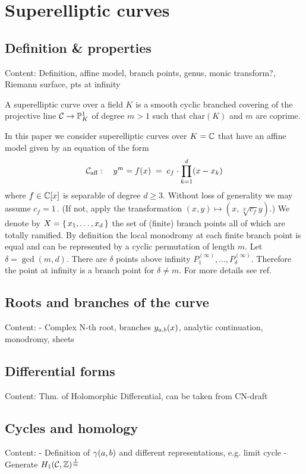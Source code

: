 \documentclass[main.tex]{subfiles}
\begin{document}
  \section{Superelliptic curves}

  \subsection{Definition \& properties}
    Content: Definition, affine model, branch points, genus, monic transform?, Riemann surface, pts at infinity
    
    \begin{defn}\label{def:SEDEF}
       A superelliptic curve over a field $K$ is a smooth cyclic branched covering of the projective line 
       $\mathcal{C} \rightarrow \mathbb{P}^1_K$ of degree $m > 1$ such that $\text{char}(K)$ and $m$ are coprime.
   \end{defn}
   In this paper we consider superelliptic curves over $K = \mathbb{C}$ that have an affine model given by an equation of the form
    \begin{align}\label{eq:aff_model}
     \mathcal{C}_{\text{aff}} : \quad y^m = f(x) \;= \; c_f \cdot \prod_{k=1}^d (x-x_k)
    \end{align}
    where $f \in \mathbb{C}[x]$ is separable of degree $d \ge 3$.
    Without loss of generality we may assume $c_f = 1$\,. (If not, apply the transformation $(x,y) \mapsto (x,\sqrt[N]{c_f}y)$.)
    We denote by $X = \{ \, x_1,\dots,x_d \,\}$ the set of (finite) branch points all of which are totally ramified. By definition
  the local monodromy at each finite branch point is equal and can be represented by a cyclic permutation of length $m$.
  Let $\delta = \gcd(m,d)$. There are $\delta$ points above infinity $P_1^{(\infty)},\dots,P_{\delta}^{(\infty)}$. Therefore
  the point at infinity is a branch point for $\delta \ne m$. For more details see \todo ref.
  
  \subsection{Roots and branches of the curve}
    Content: - Complex N-th root, branches $y_{a,b}(x)$, analytic continuation, monodromy, sheets
  
  \subsection{Differential forms}
    Content: Thm. of Holomorphic Differential, can be taken from CN-draft
  
  \subsection{Cycles and homology}
    Content: - Definition of $\gamma(a,b)$ and different representations, e.g. limit cycle
	     - Generate $H_1(\mathcal{C},\mathbb{Z})^{\frac{1}{m}}$
  
\end{document}
